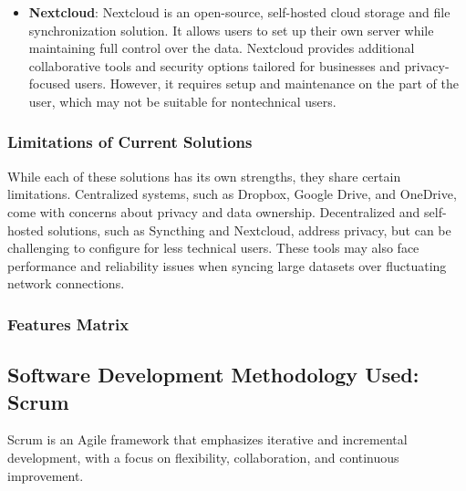 \documentclass{article}
\begin{document}
\begin{itemize}
      \item \textbf{Nextcloud}: Nextcloud is an open-source, self-hosted cloud storage and file synchronization solution. It allows users to set up their own server while maintaining full control over the data. Nextcloud provides additional collaborative tools and security options tailored for businesses and privacy-focused users. However, it requires setup and maintenance on the part of the user, which may not be suitable for nontechnical users.
  \end{itemize}

      \subsubsection{Limitations of Current Solutions}
      {
        While each of these solutions has its own strengths, they share certain limitations. Centralized systems, such as Dropbox, Google Drive, and OneDrive, come with concerns about privacy and data ownership. Decentralized and self-hosted solutions, such as Syncthing and Nextcloud, address privacy, but can be challenging to configure for less technical users. These tools may also face performance and reliability issues when syncing large datasets over fluctuating network connections.
      }
      \subsubsection{Features Matrix}

                \subsection{Software Development Methodology Used: Scrum}
        Scrum is an Agile framework that emphasizes iterative and incremental development, with a focus on flexibility, collaboration, and continuous improvement. \\
\end{document}
